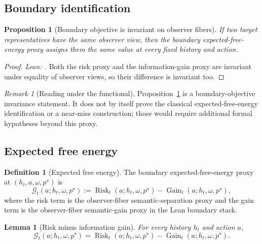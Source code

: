 \documentclass[11pt]{article}
\newtheorem{proposition}[theorem]{Proposition}
\newtheorem{lemma}[theorem]{Lemma}
\theoremstyle{definition}
\newtheorem{definition}[theorem]{Definition}
\theoremstyle{remark}
\newtheorem{remark}[theorem]{Remark}
\theoremstyle{plain}
\theoremstyle{definition}
\newcommand{\Gcal}{\mathcal{G}}
\begin{document}
\subsection{Boundary identification}
\label{sec:boundary-identification}

\begin{proposition}[Boundary objective is invariant on observer fibers]
\label{prop:boundary-identity}
If two target representatives have the same observer view, then the boundary expected-free-energy proxy assigns them the same value at every fixed history and action.
\end{proposition}

\begin{proof}
\noindent\emph{Lean: .}
Both the risk proxy and the information-gain proxy are invariant under equality of observer views, so their difference is invariant too.
\end{proof}

\begin{remark}[Reading under the functional]
\label{rem:boundary-identity}
Proposition~\ref{prop:boundary-identity} is a boundary-objective invariance statement. It does not by itself prove the classical expected-free-energy identification or a near-miss construction; those would require additional formal hypotheses beyond this proxy.
\end{remark}

\subsection{Expected free energy}

\begin{definition}[Expected free energy]
\label{def:efe}
The boundary expected-free-energy proxy at $(h_t,a,\omega,p^\star)$ is
\[
\Gcal_t(a;h_t,\omega,p^\star)
:=
\operatorname{Risk}_t(a;h_t,\omega,p^\star)
-
\operatorname{Gain}_t(a;h_t,\omega,p^\star),
\]
where the risk term is the observer-fiber semantic-separation proxy and the gain term is the observer-fiber semantic-gain proxy in the Lean boundary stack.
\end{definition}

\begin{lemma}[Risk minus information gain]
\label{lem:risk-ig}
For every history $h_t$ and action $a$,
\[
\Gcal_t(a;h_t,\omega,p^\star)
=
\operatorname{Risk}_t(a;h_t,\omega,p^\star)
-
\operatorname{Gain}_t(a;h_t,\omega,p^\star).
\]
\end{lemma}
\end{document}
